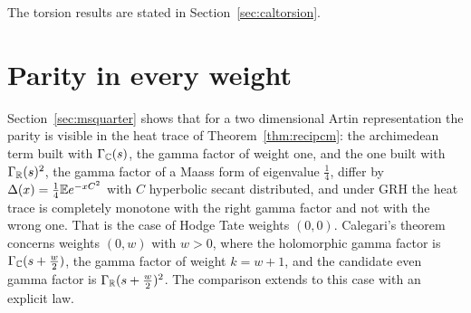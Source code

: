 The torsion results are stated in Section~\ref{sec:caltorsion}.

\section{Parity in every weight}\label{sec:calparity}

Section~\ref{sec:msquarter} shows that for a two dimensional Artin representation the parity is visible in the heat trace of Theorem~\ref{thm:recipcm}: the archimedean term built with $\Gamma_{\mathbb{C}}(s)$, the gamma factor of weight one, and the one built with $\Gamma_{\mathbb{R}}(s)^2$, the gamma factor of a Maass form of eigenvalue $\frac14$, differ by $\Delta(x)=\frac14\mathbb{E} e^{-xC^2}$ with $C$ hyperbolic secant distributed, and under GRH the heat trace is completely monotone with the right gamma factor and not with the wrong one. That is the case of Hodge Tate weights $(0,0)$. Calegari's theorem concerns weights $(0,w)$ with $w>0$, where the holomorphic gamma factor is $\Gamma_{\mathbb{C}}(s+\frac w2)$, the gamma factor of weight $k=w+1$, and the candidate even gamma factor is $\Gamma_{\mathbb{R}}(s+\frac w2)^2$. The comparison extends to this case with an explicit law.

